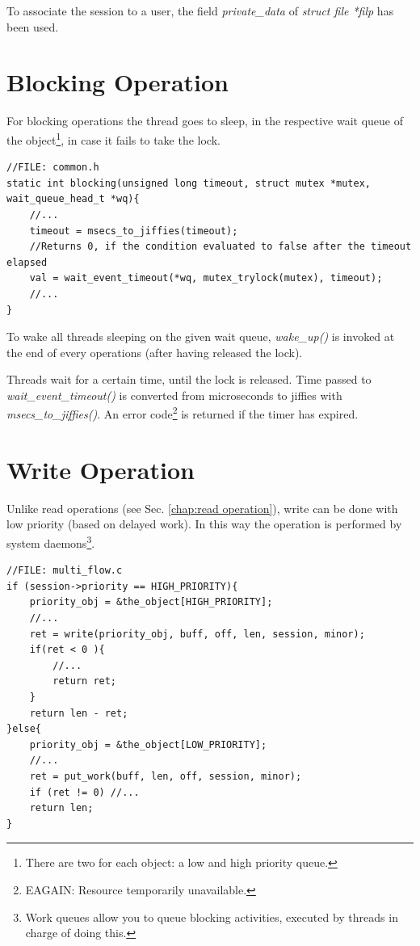 \documentclass[12pt]{report}
\begin{document}
To associate the session to a user, the field \emph{private\_data} of \emph{struct file *filp} has been used. 

\section{Blocking Operation}
\label{chap:blocking operation}
For blocking operations the thread goes to sleep, in the respective wait queue of the object\footnote{There are  two for each object: a low and high priority queue.}, in case it fails to take the lock. 

\begin{lstlisting}
//FILE: common.h
static int blocking(unsigned long timeout, struct mutex *mutex, wait_queue_head_t *wq){
	//...	
	timeout = msecs_to_jiffies(timeout); 	
	//Returns 0, if the condition evaluated to false after the timeout elapsed
	val = wait_event_timeout(*wq, mutex_trylock(mutex), timeout);
	//...
}
\end{lstlisting}

To wake all threads sleeping on the given wait queue, \emph{wake\_up()} is invoked at the end of every operations (after having released the lock). 

Threads wait for a certain time, until the lock is released. Time passed to \emph{wait\_event\_timeout()} is converted from microseconds to jiffies with \emph{msecs\_to\_jiffies()}. An error code\footnote{EAGAIN: Resource temporarily unavailable.} is returned if the timer has expired.

\section{Write Operation}
\label{chap:write operation}

Unlike read operations (see Sec. \ref{chap:read operation}), write can be done with low priority (based on delayed work). In this way the operation is performed by system daemons\footnote{Work queues allow you to queue blocking activities, executed by threads in charge of doing this.}.

\begin{lstlisting}
//FILE: multi_flow.c
if (session->priority == HIGH_PRIORITY){
	priority_obj = &the_object[HIGH_PRIORITY];
	//...	
	ret = write(priority_obj, buff, off, len, session, minor);
	if(ret < 0 ){
	    //...
	    return ret;
	}
	return len - ret;
}else{
	priority_obj = &the_object[LOW_PRIORITY];
	//...	
	ret = put_work(buff, len, off, session, minor);
	if (ret != 0) //...
	return len;
}
\end{lstlisting}
\end{document}
